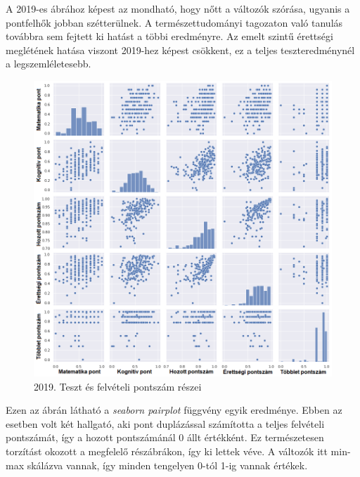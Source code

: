 \documentclass[12pt]{article}
\begin{document}
A 2019-es ábrához képest az mondható, hogy nőtt a változók szórása, ugyanis a pontfelhők jobban szétterülnek. A természettudományi tagozaton való tanulás továbbra sem fejtett ki hatást a többi eredményre. Az emelt szintű érettségi meglétének hatása viszont 2019-hez képest csökkent, ez a teljes teszteredménynél a legszemléletesebb.

\begin{figure}[H]
\centering
\includegraphics[width=\textwidth]{kepek/2019minmax3.png}
\caption{2019. Teszt és felvételi pontszám részei}
\label{fig:2019minmax3}
\end{figure}

Ezen az ábrán látható a \textit{seaborn pairplot} függvény egyik eredménye. Ebben az esetben volt két hallgató, aki pont duplázással számította a teljes felvételi pontszámát, így a hozott pontszámánál 0 állt értékként. Ez természetesen torzítást okozott a megfelelő részábrákon, így ki lettek véve. A változók itt min-max skálázva vannak, így minden tengelyen 0-tól 1-ig vannak értékek.
\end{document}
